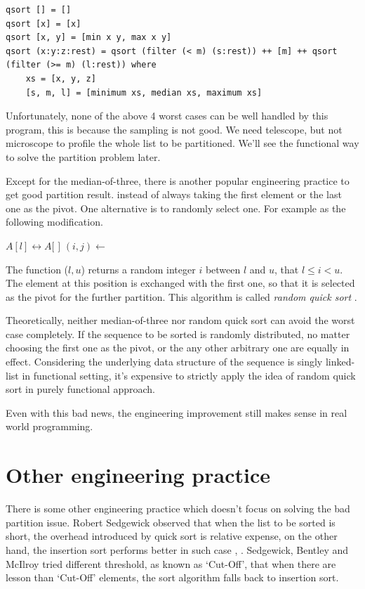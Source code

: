 \documentclass[b5paper]{article}
\begin{document}
\lstset{language=Haskell}
\begin{lstlisting}
qsort [] = []
qsort [x] = [x]
qsort [x, y] = [min x y, max x y]
qsort (x:y:z:rest) = qsort (filter (< m) (s:rest)) ++ [m] ++ qsort (filter (>= m) (l:rest)) where
    xs = [x, y, z]
    [s, m, l] = [minimum xs, median xs, maximum xs]
\end{lstlisting}

Unfortunately, none of the above 4 worst cases can be well handled by this program, this is because
the sampling is not good. We need telescope, but not microscope to profile the whole list to be
partitioned. We'll see the functional way to solve the partition problem later.

Except for the median-of-three, there is another popular engineering practice to get good partition
result. instead of always taking the first element or the last one as the pivot. One alternative is
to randomly select one. For example as the following modification.

\begin{algorithmic}[1]
    \State {} $A[l] \leftrightarrow A[$  $]$
    \State $(i, j) \gets $ 
    \State {}
    \State {}
  \EndIf
\EndProcedure
\end{algorithmic}

The function ($l, u$) returns a random integer $i$ between $l$ and $u$, that
$l \leq i < u$. The element at this position is exchanged with the first one, so that it is
selected as the pivot for the further partition. This algorithm is called {\em random quick sort} \cite{CLRS}.

Theoretically, neither median-of-three nor random quick sort can avoid the worst case completely.
If the sequence to be sorted is randomly distributed, no matter choosing the first one as the
pivot, or the any other arbitrary one are equally in effect. Considering the underlying data
structure of the sequence is singly linked-list in functional setting, it's expensive to
strictly apply the idea of random quick sort in purely functional approach.

Even with this bad news, the engineering improvement still makes sense in real world programming.

\section{Other engineering practice}
There is some other engineering practice which doesn't focus on solving the bad partition issue.
Robert Sedgewick observed that when the list to be sorted is short, the overhead introduced by
quick sort is relative expense, on the other hand, the insertion sort performs better in such
case \cite{Bentley}, \cite{3-way-part}. Sedgewick, Bentley and McIlroy tried different
threshold, as known as `Cut-Off', that when
there are lesson than `Cut-Off' elements, the sort algorithm falls back to insertion sort.
\end{document}
